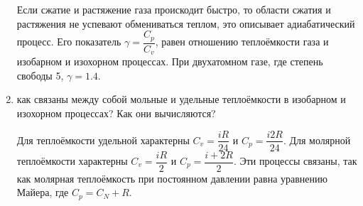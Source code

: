 \documentclass[12pt,a4paper]{article}%
\begin{document}
\begin{enumerate}
	Если сжатие и растяжение газа проискодит быстро, то области сжатия и растяжения не успевают обмениваться теплом, это описывает адиабатический процесс. Его показатель $ \gamma = \dfrac{C_p}{C_v} $, равен отношению теплоёмкости газа и изобарном и изохорном процессах. При двухатомном газе, где степень свободы 5, $ \gamma = 1.4 $.
	
	\item как связаны между собой мольные и удельные теплоёмкости в изобарном и изохорном процессах? Как они вычисляются?
	
	Для теплоёмкости удельной характерны $ C_v = \dfrac{iR}{24} $ и $ C_p = \dfrac{i2R}{24} $. Для молярной теплоёмкости характерны $ C_v = \dfrac{iR}{2} $ и $ C_p = \dfrac{i+2R}{2} $. Эти процессы связаны, так как молярная теплоёмкость при постоянном давлении равна уравнению Майера, где $ C_p = C_N + R $.
\end{enumerate}

 
\end{document}

